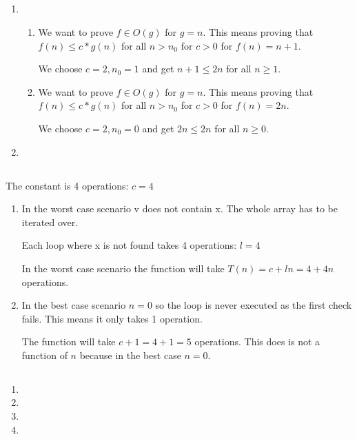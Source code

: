 \documentclass[12pt]{article}
\begin{document}
\subsection{} %
\begin{enumerate}[a]
	\item %
	\begin{enumerate}[a]
		\item %
		We want to prove $f \in O(g)$ for $g = n$. This means proving that $f(n) \leq c * g(n)$ for all $n > n_0$ for $c > 0$ for $f(n) = n + 1$.

		We choose $c = 2, n_0 = 1$ and get $n + 1 \leq 2n$ for all $n \geq 1$.

		\item %
		We want to prove $f \in O(g)$ for $g = n$. This means proving that $f(n) \leq c * g(n)$ for all $n > n_0$ for $c > 0$ for $f(n) = 2n$.

		We choose $c = 2, n_0 = 0$ and get $2n \leq 2n$ for all $n \geq 0$.
	\end{enumerate}

	\item %
\end{enumerate}

\subsection{} %
The constant is 4 operations: $c = 4$

\begin{enumerate}[a]
	\item %
	In the worst case scenario v does not contain x. The whole array has to be iterated over.

	Each loop where x is not found takes 4 operations: $l = 4$

	In the worst case scenario the function will take $T(n) = c + ln = 4 + 4n$ operations.

	\item %
	In the best case scenario $n = 0$ so the loop is never executed as the first check fails. This means it only takes 1 operation.

	The function will take $c + 1 = 4 + 1 = 5$ operations. This does is not a function of $n$ because in the best case $n = 0$.
\end{enumerate}

\subsection{} %
\begin{enumerate}[a]
	\item %
	\item %
	\item %
	\item %
\end{enumerate}

\subsection{} %


\subsection{} %

\end{document}
